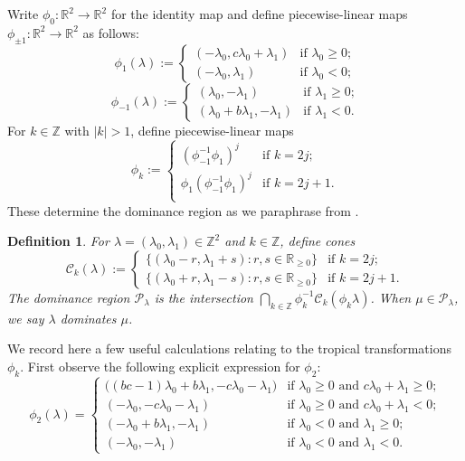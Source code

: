 \documentclass[pdflatex,sn-mathphys]{sn-jnl}%
\theoremstyle{thmstyleone}%
\theoremstyle{thmstyletwo}%
\theoremstyle{thmstylethree}%
\newtheorem{definition}[theorem]{Definition}
\newcommand{\cC}{\mathcal{C}}
\newcommand{\cP}{\mathcal{P}}
\newcommand{\RR}{\mathbb{R}}
\newcommand{\ZZ}{\mathbb{Z}}
\begin{document}
  Write $\phi_0:\RR^2\to\RR^2$ for the identity map and define piecewise-linear maps $\phi_{\pm 1}:\RR^2\to\RR^2$ as follows:
  \begin{equation}
    \label{eq:forward mutation 1}
    \phi_1(\lambda)
    :=
    \begin{cases} 
      (-\lambda_0,c\lambda_0+\lambda_1) & \text{if $\lambda_0 \ge 0$;}\\
      (-\lambda_0,\lambda_1) & \text{if $\lambda_0 < 0$;}
    \end{cases}
  \end{equation}
  \[
    \phi_{-1}(\lambda)
    :=
    \begin{cases} 
      (\lambda_0,-\lambda_1) & \text{if $\lambda_1 \ge 0$;}\\
      (\lambda_0+b\lambda_1,-\lambda_1) & \text{if $\lambda_1 < 0$.}
    \end{cases}
  \]
  For $k\in\ZZ$ with $|k|>1$, define piecewise-linear maps
  \[\phi_k
    :=
    \begin{cases}
      (\phi_{-1}^{-1}\phi_1)^j & \text{if $k=2j$;}\\
      \phi_1(\phi_{-1}^{-1}\phi_1)^j & \text{if $k=2j+1$.}\\
    \end{cases}
  \]
  These determine the dominance region as we paraphrase from \cite[Section 3.1]{Qin19}.
  \begin{definition}
    \label{def:dominance}
    For $\lambda=(\lambda_0,\lambda_1)\in\ZZ^2$ and $k\in\ZZ$, define cones 
    \[\cC_k(\lambda)
      :=
      \begin{cases}
        \{(\lambda_0-r,\lambda_1+s):r,s\in\RR_{\ge0}\} & \text{if $k=2j$;}\\
        \{(\lambda_0+r,\lambda_1-s):r,s\in\RR_{\ge0}\} & \text{if $k=2j+1$.}
      \end{cases}
    \]
    The \emph{dominance region} $\cP_\lambda$ is the intersection  $\bigcap_{k\in\ZZ}\phi_k^{-1}\cC_k(\phi_k\lambda)$.
    When $\mu\in\cP_\lambda$, we say \emph{$\lambda$ dominates $\mu$}.
  \end{definition}

  We record here a few useful calculations relating to the tropical transformations $\phi_k$.
  First observe the following explicit expression for $\phi_2$:
  \begin{equation}
    \label{eq:forward two step mutation}
    \phi_2(\lambda)
    =
    \begin{cases}
      \big((bc-1)\lambda_0+b\lambda_1, -c\lambda_0-\lambda_1\big) & \text{if $\lambda_0\ge 0$ and $c\lambda_0+\lambda_1\ge 0$;}\\
      (-\lambda_0, -c\lambda_0-\lambda_1) & \text{if $\lambda_0\ge 0$ and $c\lambda_0+\lambda_1<0$;}\\
      (-\lambda_0+b\lambda_1, -\lambda_1) & \text{if $\lambda_0<0$ and $\lambda_1\ge 0$;}\\
      (-\lambda_0,-\lambda_1) & \text{if $\lambda_0<0$ and $\lambda_1<0$.}
    \end{cases}
  \end{equation}
\end{document}
